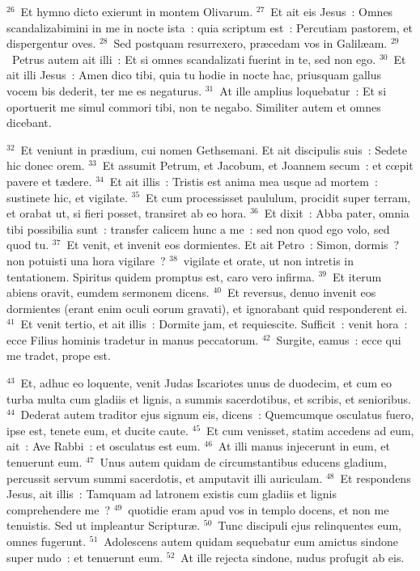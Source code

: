 ${}^{26}$~Et hymno dicto exierunt in montem Olivarum.
${}^{27}$~Et ait eis Jesus~: Omnes scandalizabimini in me in nocte ista~: quia scriptum est~: Percutiam pastorem, et dispergentur oves.
${}^{28}$~Sed postquam resurrexero, pr\ae cedam vos in Galil\ae am.
${}^{29}$~Petrus autem ait illi~: Et si omnes scandalizati fuerint in te, sed non ego.
${}^{30}$~Et ait illi Jesus~: Amen dico tibi, quia tu hodie in nocte hac, priusquam gallus vocem bis dederit, ter me es negaturus.
${}^{31}$~At ille amplius loquebatur~: Et si oportuerit me simul commori tibi, non te negabo. Similiter autem et omnes dicebant.


${}^{32}$~Et veniunt in pr\ae dium, cui nomen Gethsemani. Et ait discipulis suis~: Sedete hic donec orem.
${}^{33}$~Et assumit Petrum, et Jacobum, et Joannem secum~: et cœpit pavere et t\ae dere.
${}^{34}$~Et ait illis~: Tristis est anima mea usque ad mortem~: sustinete hic, et vigilate.
${}^{35}$~Et cum processisset paululum, procidit super terram, et orabat ut, si fieri posset, transiret ab eo hora.
${}^{36}$~Et dixit~: Abba pater, omnia tibi possibilia sunt~: transfer calicem hunc a me~: sed non quod ego volo, sed quod tu.
${}^{37}$~Et venit, et invenit eos dormientes. Et ait Petro~: Simon, dormis~? non potuisti una hora vigilare~?
${}^{38}$~vigilate et orate, ut non intretis in tentationem. Spiritus quidem promptus est, caro vero infirma.
${}^{39}$~Et iterum abiens oravit, eumdem sermonem dicens.
${}^{40}$~Et reversus, denuo invenit eos dormientes (erant enim oculi eorum gravati), et ignorabant quid responderent ei.
${}^{41}$~Et venit tertio, et ait illis~: Dormite jam, et requiescite. Sufficit~: venit hora~: ecce Filius hominis tradetur in manus peccatorum.
${}^{42}$~Surgite, eamus~: ecce qui me tradet, prope est.


${}^{43}$~Et, adhuc eo loquente, venit Judas Iscariotes unus de duodecim, et cum eo turba multa cum gladiis et lignis, a summis sacerdotibus, et scribis, et senioribus.
${}^{44}$~Dederat autem traditor ejus signum eis, dicens~: Quemcumque osculatus fuero, ipse est, tenete eum, et ducite caute.
${}^{45}$~Et cum venisset, statim accedens ad eum, ait~: Ave Rabbi~: et osculatus est eum.
${}^{46}$~At illi manus injecerunt in eum, et tenuerunt eum.
${}^{47}$~Unus autem quidam de circumstantibus educens gladium, percussit servum summi sacerdotis, et amputavit illi auriculam.
${}^{48}$~Et respondens Jesus, ait illis~: Tamquam ad latronem existis cum gladiis et lignis comprehendere me~?
${}^{49}$~quotidie eram apud vos in templo docens, et non me tenuistis. Sed ut impleantur Scriptur\ae .
${}^{50}$~Tunc discipuli ejus relinquentes eum, omnes fugerunt.
${}^{51}$~Adolescens autem quidam sequebatur eum amictus sindone super nudo~: et tenuerunt eum.
${}^{52}$~At ille rejecta sindone, nudus profugit ab eis.


